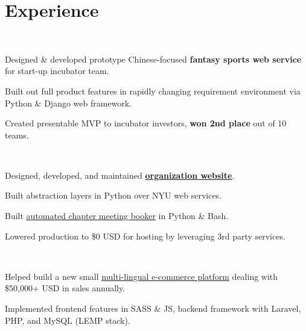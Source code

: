 \documentclass[]{hieudo-build}
\begin{document}
\hfill
\begin{minipage}[t]{0.65\textwidth} 

\section{Experience}

\\
\vspace{0.9em} %
\begin{tightemize}
\item Designed \& developed prototype Chinese-focused {\bf fantasy sports web service} for start-up incubator team.
\item Built out full product features in rapidly changing requirement environment via Python \& Django web framework.
\item Created presentable MVP to incubator investors, {\bf won 2nd place} out of 10 teams.

\end{tightemize}
\sectionsep

\\
\begin{tightemize}
\item Designed, developed, and maintained  {\bf \href{https://www.skullhouse.nyc}{organization website}}.
\item Built abstraction layers in Python over NYU web services.
\item Built \href{https://github.com/JasonYao/Bobst-Room-Automator}{automated chapter meeting booker} in Python \& Bash.
\item Lowered production to \$0 USD for hosting by leveraging 3rd party services.

\end{tightemize}
\sectionsep

 \\
\begin{tightemize}
\item Helped build a new small \href{http://hivi.us/}{multi-lingual e-commerce platform} dealing with \$50,000+ USD in sales annually.
\item Implemented frontend features in SASS \& JS, backend framework with Laravel, PHP, and MySQL (LEMP stack).


\end{tightemize}
\end{minipage}
\end{document}
